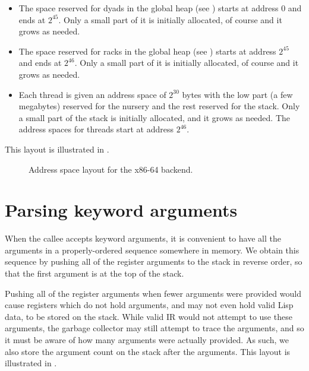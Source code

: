\begin{itemize}
\item The space reserved for dyads in the global heap (see
  ) starts at address $0$ and ends at
  $2^{45}$.  Only a small part of it is initially allocated, of course
  and it grows as needed.
\item The space reserved for racks in the global heap (see
  ) starts at address $2^{45}$ and ends at
  $2^{46}$.  Only a small part of it is initially allocated, of course
  and it grows as needed.
\item Each thread is given an address space of $2^{30}$ bytes with the
  low part (a few megabytes) reserved for the nursery and the rest
  reserved for the stack.  Only a small part of the stack is initially
  allocated, and it grows as needed.  The address spaces for threads
  start at address $2^{46}$.
\end{itemize}

This layout is illustrated in .

\begin{figure}
\begin{center}
\end{center}
\caption{\label{fig-address-space-x86-64}
Address space layout for the x86-64 backend.}
\end{figure}

\section{Parsing keyword arguments}

When the callee accepts keyword arguments, it is convenient to have
all the arguments in a properly-ordered sequence somewhere in memory.
We obtain this sequence by pushing all of the register arguments to
the stack in reverse order, so that the first argument is at the top
of the stack.

Pushing all of the register arguments when fewer arguments were
provided would cause registers which do not hold arguments, and may
not even hold valid Lisp data, to be stored on the stack.  While valid
IR would not attempt to use these arguments, the garbage collector may
still attempt to trace the arguments, and so it must be aware of how
many arguments were actually provided. As such, we also store the
argument count on the stack after the arguments.  This layout is
illustrated in .

